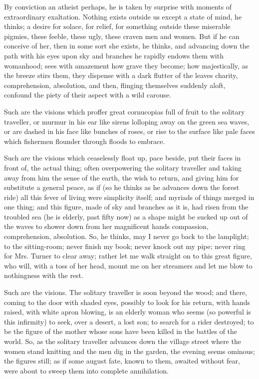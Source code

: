 \documentclass[lang=cn,10pt]{elegantbook}
\begin{document}
By conviction an atheist perhaps, he is taken by surprise with
moments of extraordinary exaltation.  Nothing exists outside us
except a state of mind, he thinks; a desire for solace, for relief,
for something outside these miserable pigmies, these feeble, these
ugly, these craven men and women.  But if he can conceive of her,
then in some sort she exists, he thinks, and advancing down the
path with his eyes upon sky and branches he rapidly endows them
with womanhood; sees with amazement how grave they become; how
majestically, as the breeze stirs them, they dispense with a dark
flutter of the leaves charity, comprehension, absolution, and then,
flinging themselves suddenly aloft, confound the piety of their
aspect with a wild carouse.

Such are the visions which proffer great cornucopias full of fruit
to the solitary traveller, or murmur in his ear like sirens
lolloping away on the green sea waves, or are dashed in his face
like bunches of roses, or rise to the surface like pale faces which
fishermen flounder through floods to embrace.

Such are the visions which ceaselessly float up, pace beside, put
their faces in front of, the actual thing; often overpowering the
solitary traveller and taking away from him the sense of the earth,
the wish to return, and giving him for substitute a general peace,
as if (so he thinks as he advances down the forest ride) all this
fever of living were simplicity itself; and myriads of things
merged in one thing; and this figure, made of sky and branches as
it is, had risen from the troubled sea (he is elderly, past fifty
now) as a shape might be sucked up out of the waves to shower down
from her magnificent hands compassion, comprehension, absolution.
So, he thinks, may I never go back to the lamplight; to the
sitting-room; never finish my book; never knock out my pipe; never
ring for Mrs. Turner to clear away; rather let me walk straight on
to this great figure, who will, with a toss of her head, mount me
on her streamers and let me blow to nothingness with the rest.

Such are the visions.  The solitary traveller is soon beyond the
wood; and there, coming to the door with shaded eyes, possibly to
look for his return, with hands raised, with white apron blowing,
is an elderly woman who seems (so powerful is this infirmity) to
seek, over a desert, a lost son; to search for a rider destroyed;
to be the figure of the mother whose sons have been killed in the
battles of the world.  So, as the solitary traveller advances down
the village street where the women stand knitting and the men dig
in the garden, the evening seems ominous; the figures still; as if
some august fate, known to them, awaited without fear, were about
to sweep them into complete annihilation.
\end{document}
